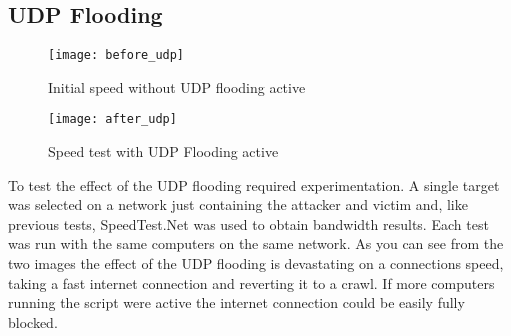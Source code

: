 \subsection{UDP Flooding}
\begin{wrapfigure}{r}{5cm}
\begin{center}
	\texttt{[image: before\_udp]}
	\caption{Initial speed without UDP flooding active}
	\texttt{[image: after\_udp]}
	\caption{Speed test with UDP Flooding active}
\end{center}
\end{wrapfigure}

To test the effect of the UDP flooding required experimentation. A single target was selected on a network just containing the attacker and victim and, like previous tests, SpeedTest.Net was used to obtain bandwidth results. Each test was run with the same computers on the same network. As you can see from the two images the effect of the UDP flooding is devastating on a connections speed, taking a fast internet connection and reverting it to a crawl. If more computers running the script were active the internet connection could be easily fully blocked.